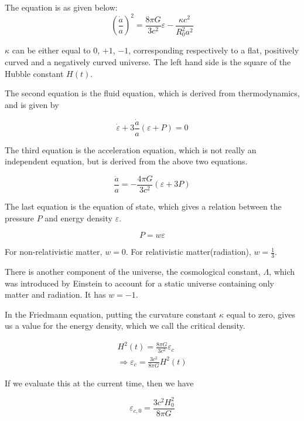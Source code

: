 \documentclass[a4,12pt,oneside]{report}
\begin{document}
	The equation is as given below:
	\begin{equation}
	\left(\frac{\dot{a}}{a}\right)^2=\frac{8\pi G}{3c^2}\varepsilon-\frac{\kappa c^2}{R_0^2a^2}
	\end{equation}
	
	$\kappa$ can be either equal to $0$, $+1$, $-1$, corresponding respectively to a flat, positively curved and a negatively curved universe.
	The left hand side is the square of the Hubble constant $H(t)$.
	
	The second equation is the fluid equation, which is derived from thermodynamics, and is given by
	
	\begin{equation}
		\dot{\varepsilon}+3\frac{\dot{a}}{a}(\varepsilon+P)=0
	\end{equation}
	
	The third equation is the acceleration equation, which is not really an independent equation, but is derived from the above two equations.
	
	\begin{equation}
		\frac{\ddot{a}}{a}=-\frac{4\pi G}{3c^2}(\varepsilon+3P)
	\end{equation}
	
	The last equation is the equation of state, which gives a relation between the pressure $P$ and energy density $\varepsilon$.
	
	\begin{equation}
		P=w\varepsilon
	\end{equation}
	
	For non-relativistic matter, $w=0$. For relativistic matter(radiation), $w=\frac{1}{3}$.
	
	There is another component of the universe, the cosmological constant, $\Lambda$, which was introduced by Einstein to account for a static universe containing only matter and radiation. It has $w=-1$.
	
	In the Friedmann equation, putting the curvature constant $\kappa$ equal to zero, gives us a value for the energy density, which we call the critical density.
	
	\begin{align}
	H^2(t)=\frac{8\pi G}{3c^2}\varepsilon_c \\
	\Rightarrow \varepsilon_c=\frac{3c^2}{8\pi G}H^2(t)
	\end{align}
	
	If we evaluate this at the current time, then we have
	
	\begin{equation}
		\varepsilon_{c,0}=\frac{3c^2H_0^2}{8\pi G}
	\end{equation}
    
\end{document}
